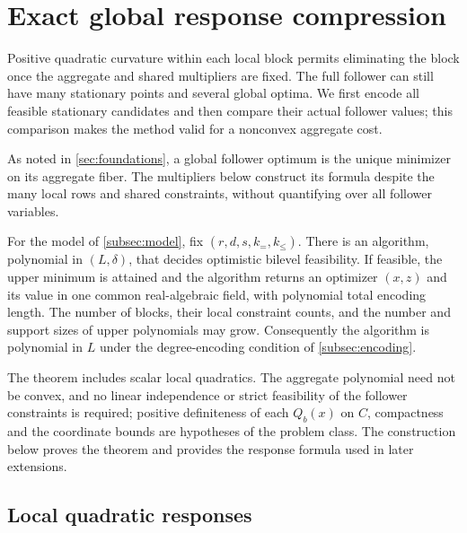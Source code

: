 \section{Exact global response compression}\label{sec:exact}

Positive quadratic curvature within each local block permits eliminating
the block once the aggregate and shared multipliers are fixed. The full
follower can still have many stationary points and several global optima.
We first encode all feasible stationary candidates and then compare their
actual follower values; this comparison makes the method valid for a
nonconvex aggregate cost.

As noted in \cref{sec:foundations}, a global follower optimum is the
unique minimizer on its aggregate fiber. The multipliers below construct its formula
despite the many local rows and shared constraints, without quantifying
over all follower variables.

\begin{theorem}\label{thm:exact-block}
For the model of \cref{subsec:model}, fix
$(r,d,s,k_=,k_{\le})$. There is an algorithm, polynomial in $(L,\delta)$,
that decides optimistic bilevel feasibility. If feasible, the upper
minimum is attained and the algorithm returns an optimizer $(x,z)$ and
its value in one common real-algebraic field, with polynomial total
encoding length. The number of blocks, their local constraint counts,
and the number and support sizes of upper polynomials may grow.
Consequently the algorithm is polynomial in $L$ under the degree-encoding
condition of \cref{subsec:encoding}.
\end{theorem}

The theorem includes scalar local quadratics. The aggregate polynomial
need not be convex, and no linear independence or strict feasibility of
the follower constraints is required; positive definiteness of each
$Q_b(x)$ on $C$, compactness and the coordinate bounds are hypotheses of
the problem class. The construction below proves the theorem and provides
the response formula used in later extensions.

\subsection{Local quadratic responses}\label{subsec:local-elimination}

